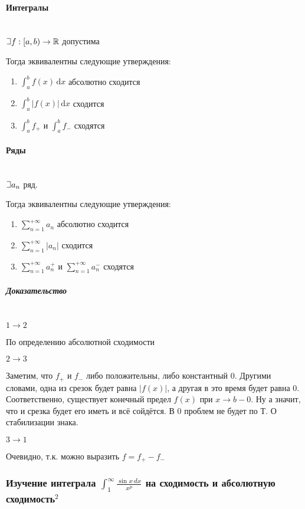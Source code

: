 \documentclass{article}
\def\letus{%
\mathord{\setbox0=\hbox{$\exists$}%
         \hbox{\kern 0.125\wd0%
               \vbox to \ht0{%
                  \hrule width 0.75\wd0%
                  \vfill%
                  \hrule width 0.75\wd0}%
               \vrule height \ht0%
               \kern 0.125\wd0}%
       }%
        }
\def\D{\,\mathrm{d}}
\let\vanillaparagraph\paragraph
\let\vanillasubparagraph\subparagraph
\renewcommand{\paragraph}[1]{\vanillaparagraph{#1}\mbox{}\\}
\renewcommand{\subparagraph}[1]{\vanillasubparagraph{#1}\mbox{}\\}
\begin{document}
\paragraph{Интегралы}
$\letus f: [a, b) \rightarrow \mathbb{R}$ допустима

Тогда эквивалентны следующие утверждения:
\begin{enumerate}
    \item $\int_a^b f(x) \D x$ абсолютно сходится
    \item $\int_a^b |f(x)| \D x$ сходится
    \item $\int_a^b f_+$ и $\int_a^b f_-$ сходятся
\end{enumerate}

\paragraph{Ряды}
$\letus a_n$ ряд.

Тогда эквивалентны следующие утверждения:
\begin{enumerate}
    \item $\sum_{n=1}^{+\infty} a_n$ абсолютно сходится
    \item $\sum_{n=1}^{+\infty} |a_n|$ сходится
    \item $\sum_{n=1}^{+\infty} a_n^+$ и $\sum_{n=1}^{+\infty} a_n^-$ сходятся
\end{enumerate}

\subparagraph{Доказательство}
\underline{$1 \rightarrow 2$}

По определению абсолютной сходимости

\underline{$2 \rightarrow 3$}

Заметим, что $f_+$ и $f_-$ либо положительны, либо константный $0$. Другими словами, одна из срезок будет равна $|f(x)|$, а другая в это время будет равна $0$. Соответственно, существует конечный предел $f(x)$ при $x \rightarrow b-0$. Ну а значит, что и срезка будет его иметь и всё сойдётся. В $0$ проблем не будет по Т. О стабилизации знака.

\underline{$3 \rightarrow 1$}

Очевидно, т.к. можно выразить $f = f_+ - f_-$

\subsubsection{Изучение интеграла \texorpdfstring{$\int_1^{\infty} \frac{\sin x\,dx}{x^p}$}{int [1, inf] sin(x) dx / x\^p} на сходимость и абсолютную сходимость\texorpdfstring{$^2$}{}}
\end{document}
